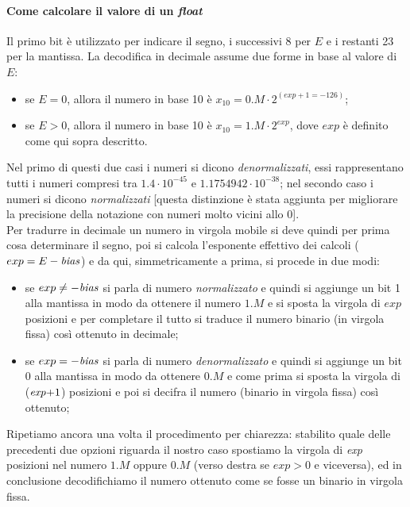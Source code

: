 \documentclass[class=book, crop=false]{standalone}
\begin{document}
\paragraph{Come calcolare il valore di un \emph{float}} Il primo bit è utilizzato per indicare il segno, i successivi 8 per $E$ e i restanti 23 per la mantissa. La decodifica in decimale assume due forme in base al valore di $E$:
\begin{itemize}[noitemsep,nolistsep]
	\item se $E=0$, allora il numero in base 10 è $x_{10}=0.M \cdot 2^{(exp+1=-126)}$;
	\item se $E>0$, allora il numero in base 10 è $x_{10}=1.M \cdot 2^{exp}$, dove $exp$ è definito come qui sopra descritto.
\end{itemize}
Nel primo di questi due casi i numeri si dicono \emph{denormalizzati}, essi rappresentano tutti i numeri compresi tra \(1.4\cdot10^{-45}\) e \(1.1754942\cdot10^{-38}\); nel secondo caso i numeri si dicono \emph{normalizzati} [questa distinzione è stata aggiunta per migliorare la precisione della notazione con numeri molto vicini allo 0].\\
Per tradurre in decimale un numero in virgola mobile si deve quindi per prima cosa determinare il segno, poi si calcola l'esponente effettivo dei calcoli ($exp=E-\text{\emph{bias}}$) e da qui, simmetricamente a prima, si procede in due modi: \\
\begin{itemize}[noitemsep,nolistsep]
	\item se $exp\neq-\text{\emph{bias}}$ si parla di numero \emph{normalizzato} e quindi si aggiunge un bit 1 alla mantissa in modo da ottenere il numero $1.M$ e si sposta la virgola di $exp$ posizioni e per completare il tutto si traduce il numero binario (in virgola fissa) così ottenuto in decimale;
	\item se $exp=-\text{\emph{bias}}$ si parla di numero \emph{denormalizzato} e quindi si aggiunge un bit 0 alla mantissa in modo da ottenere $0.M$ e come prima si sposta la virgola di ($\text{\emph{exp}+1}$) posizioni e poi si decifra il numero (binario in virgola fissa) così ottenuto;
\end{itemize}

Ripetiamo ancora una volta il procedimento per chiarezza: stabilito quale delle precedenti due opzioni riguarda il nostro caso spostiamo la virgola di \emph{exp} posizioni nel numero $1.M$ oppure $0.M$ (verso destra se $exp>0$ e viceversa), ed in conclusione decodifichiamo il numero ottenuto come se fosse un binario in virgola fissa.\\
\end{document}
